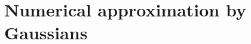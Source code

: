 \documentclass[11pt,a4paper]{article}
\begin{document}
%
%
%
%
%


\section{Numerical approximation by Gaussians}
\end{document}
